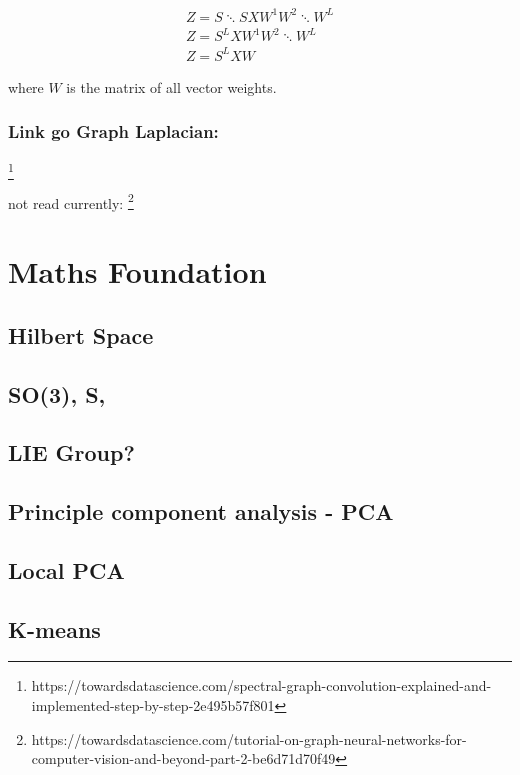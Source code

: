 \begin{equation}
    \begin{aligned}
        Z = S \ddots S X W^1 W^2 \ddots W^L \\
        Z = S^L X W^1 W^2 \ddots W^L \\
        Z = S^L X W    
    \end{aligned}
\end{equation}

where $W$ is the matrix of all vector weights.

\subsubsection{Link go Graph Laplacian:}
\footnote{https://towardsdatascience.com/spectral-graph-convolution-explained-and-implemented-step-by-step-2e495b57f801}

not read currently:
\footnote{https://towardsdatascience.com/tutorial-on-graph-neural-networks-for-computer-vision-and-beyond-part-2-be6d71d70f49}


\section{Maths Foundation}
\subsection{Hilbert Space}
\subsection{SO(3), S,}
\subsection{LIE Group?}
\subsection{Principle component analysis - PCA}
\subsection{Local PCA}
\subsection{K-means}
